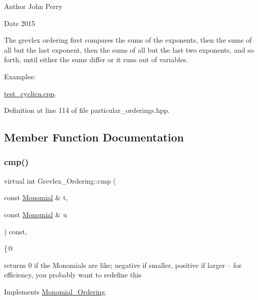 \begin{DoxyAuthor}{Author}
John Perry 
\end{DoxyAuthor}
\begin{DoxyDate}{Date}
2015
\end{DoxyDate}
The grevlex ordering first compares the sums of the exponents, then the sums of all but the last exponent, then the sums of all but the last two exponents, and so forth, until either the sums differ or it runs out of variables. \begin{Desc}
\item[Examples\+: ]\par
\hyperlink{test_cyclicn_8cpp-example}{test\+\_\+cyclicn.\+cpp}.\end{Desc}


Definition at line 114 of file particular\+\_\+orderings.\+hpp.



\subsection{Member Function Documentation}
\mbox{\label{class_grevlex___ordering_a0a8893d7c44f5d902c9ac5ed426621db}} 
\subsubsection{\texorpdfstring{cmp()}{cmp()}}
{\footnotesize\ttfamily virtual int Grevlex\+\_\+\+Ordering\+::cmp (\begin{DoxyParamCaption}\item[{const \hyperlink{class_monomial}{Monomial} \&}]{t,  }\item[{const \hyperlink{class_monomial}{Monomial} \&}]{u }\end{DoxyParamCaption}) const\hspace{0.3cm}{\ttfamily [inline]}, {\ttfamily [virtual]}}



\{@ 

returns 0 if the Monomials are like; negative if smaller, positive if larger -- for efficiency, you probably want to redefine this 

Implements \hyperlink{class_monomial___ordering_a9bc3155fc98b4d40c26118fa2114b827}{Monomial\+\_\+\+Ordering}.



